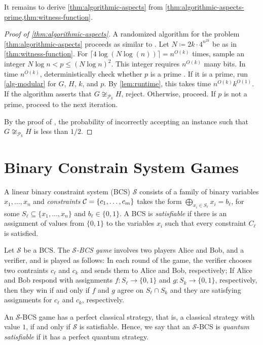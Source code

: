 \documentclass[11pt,a4paper]{article}
\theoremstyle{plain}
\theoremstyle{remark}
\theoremstyle{definition}
\def\calS{{\mathcal S}} \def\calT{{\mathcal T}} \def\calU{{\mathcal U}}
\begin{document}
It remains to derive \cref{thm:algorithmic-aspects} from \cref{thm:algorithmic-aspects-prime,thm:witness-function}. 

\begin{proof}[Proof of \cref{thm:algorithmic-aspects}]
	A randomized algorithm for the problem \cref{thm:algorithmic-aspects} proceeds as similar to \cite[Algorithm~2]{seppelt_algorithmic_2024}.
	Let $N \coloneqq 2k \cdot 4^{n^{2k}}$ be as in \cref{thm:witness-function}.
	For $\lceil 4 \log(N \log(n)) \rceil = n^{O(k)}$ times, sample an integer $N \log n < p \leq (N \log n)^2$.
	This integer requires $n^{O(k)}$ many bits.
	In time $n^{O(k)}$, deterministically check whether $p$ is a prime \cite{agrawal_primes_2004}.
	If it is a prime, run \cref{alg-modular} for $G$, $H$, $k$, and $p$.
	By \cref{lem:runtime}, this takes time $n^{O(k)}k^{O(1)}$.
	If the algorithm asserts that $G \not\cong_{\mathcal{P}_k} H$, reject.
	Otherwise, proceed.
	If $p$ is not a prime, proceed to the next iteration.

	By the proof of \cite[Theorem~1.1]{seppelt_algorithmic_2024},
	the probability of incorrectly accepting an instance such that $G \not\cong_{\mathcal{P}_k} H$ is less than $1/2$.
\end{proof}

\iffalse
\section{Binary Constrain System Games}

A linear binary constraint system (BCS) $\calS$ consists of a family of binary variables $x_1,\dots,x_n$ and \emph{constraints} ${\mathcal C} = \{c_1,\dots,c_m\}$ takes the form $\bigoplus_{x_i\in S_\ell}x_i = b_\ell$, for some $S_\ell \subseteq \{x_1,\dots,x_n\}$ and $b_\ell \in \{0, 1\}$.
A BCS is \emph{satisfiable} if there is an assignment of values from $\{0,1\}$ to the variables $x_i$ such that every constraint $C_\ell$ is satisfied.

Let $\calS$ be a BCS.
The \emph{$\calS$-BCS game} involves two players Alice and Bob, and a verifier, and is played as follows: In each round of the game, the verifier chooses two contraints $c_\ell$ and $c_k$ and sends them to Alice and Bob, respectively; If Alice and Bob respond with assignments $f \colon S_\ell\to \{0,1\}$ and $g\colon S_k\to\{0,1\}$, respectively, then they win if and only if $f$ and $g$ agree on $S_\ell\cap S_k$ and they are satisfying assignments for $c_\ell$ and $c_k$, respectively.

An $\calS$-BCS game has a perfect classical strategy, that is, a classical strategy with value $1$, if and only if $\calS$ is satisfiable.
Hence, we say that an $\calS$-BCS is \emph{quantum satisfiable} if it has a perfect quantum strategy.
\end{document}

